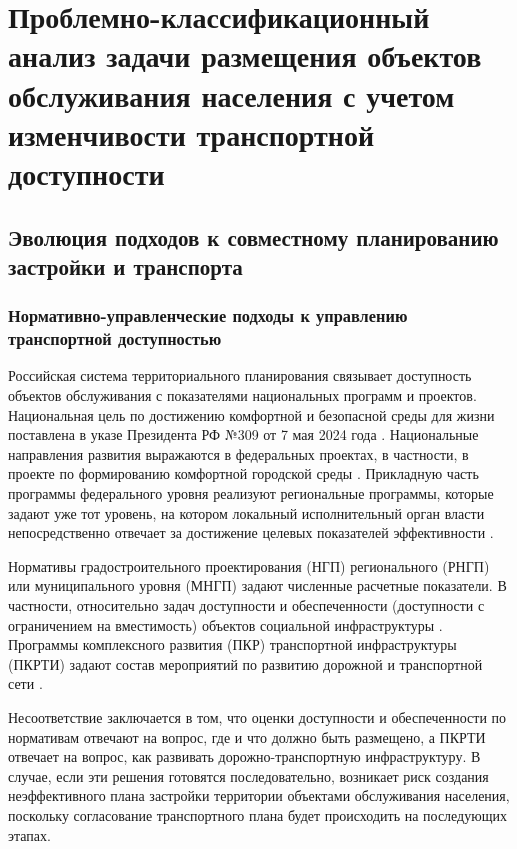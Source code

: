 \chapter{Проблемно-классификационный анализ задачи размещения объектов обслуживания населения с учетом изменчивости транспортной доступности}
\label{ch:problem-analysis}
\label{ch:ch1}

\section{Эволюция подходов к совместному планированию застройки и транспорта}
\label{sec:planning-modeling-evolution}

\subsection{Нормативно-управленческие подходы к управлению транспортной доступностью}
\label{subsec:normative-problem-statement}

Российская система территориального планирования связывает доступность объектов обслуживания с показателями национальных программ и проектов. Национальная цель по достижению комфортной и безопасной среды для жизни поставлена в указе Президента РФ №309 от 7 мая 2024 года \cite{rfDecree309_2024}. Национальные направления развития выражаются в федеральных проектах, в частности, в проекте по формированию комфортной городской среды \cite{federalProjectFkgsPassport}. Прикладную часть программы федерального уровня реализуют региональные программы, которые задают уже тот уровень, на котором локальный исполнительный орган власти непосредственно отвечает за достижение целевых показателей эффективности \cite{spbRegionalFkgs}.

Нормативы градостроительного проектирования (НГП) регионального (РНГП) или муниципального уровня (МНГП) задают численные расчетные показатели. В частности, относительно задач  доступности и обеспеченности (доступности с ограничением на вместимость) объектов социальной инфраструктуры \cite{gradcode29_2}. Программы комплексного развития (ПКР) транспортной инфраструктуры (ПКРТИ) задают состав мероприятий по развитию дорожной и транспортной сети \cite{govDecree1440Pkrti}.

Несоответствие заключается в том, что оценки доступности и обеспеченности по нормативам отвечают на вопрос, где и что должно быть размещено, а ПКРТИ отвечает на вопрос, как развивать дорожно-транспортную инфраструктуру. В случае, если эти решения готовятся последовательно, возникает риск создания неэффективного плана застройки территории объектами обслуживания населения, поскольку согласование транспортного плана будет происходить на последующих этапах.

